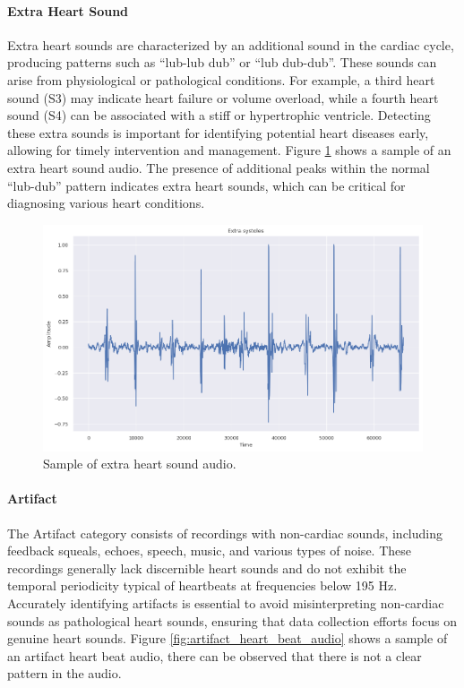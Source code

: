 \paragraph{Extra Heart Sound}
Extra heart sounds are characterized by an additional sound in the cardiac cycle, producing patterns such as ``lub-lub dub'' or ``lub dub-dub''.
These sounds can arise from physiological or pathological conditions. For example, a third heart sound (S3) may indicate heart failure or volume overload,
while a fourth heart sound (S4) can be associated with a stiff or hypertrophic ventricle.
Detecting these extra sounds is important for identifying potential heart diseases early, allowing for timely intervention and management.
Figure \ref{fig:extrahls_heart_beat_audio} shows a sample of an extra heart sound audio.
The presence of additional peaks within the normal ``lub-dub'' pattern indicates extra heart sounds, which can be
critical for diagnosing various heart conditions.

\begin{figure}[H]
    \centering
    \includegraphics[width=.9\columnwidth]{../images/extrastoles_heart_beat_audio.png}
    \caption{Sample of extra heart sound audio.}
    \label{fig:extrahls_heart_beat_audio}
\end{figure}

\paragraph{Artifact}
The Artifact category consists of recordings with non-cardiac sounds, including feedback squeals, echoes, speech, music, and various types of noise.
These recordings generally lack discernible heart sounds and do not exhibit the temporal periodicity typical of heartbeats at frequencies below 195 Hz.
Accurately identifying artifacts is essential to avoid misinterpreting non-cardiac sounds as pathological heart sounds,
ensuring that data collection efforts focus on genuine heart sounds.
Figure \ref{fig:artifact_heart_beat_audio} shows a sample of an artifact heart beat audio, there can be observed that there is not a clear pattern in the audio.

